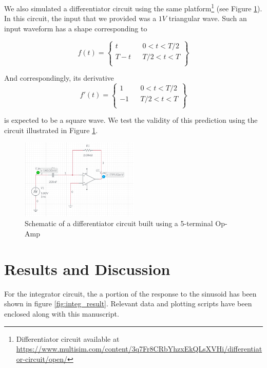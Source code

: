 \documentclass{article}
\begin{document}
	
 We also simulated a differentiator circuit using the same platform\footnote{Differentiator circuit available at \url{https://www.multisim.com/content/3q7Fr8CRbYhzxEkQLsXVHi/differentiator-circuit/open/}} (see Figure \ref{fig:diff_circuit}). In this circuit, the input that we provided was a $1V$ triangular wave. Such an input waveform has a shape corresponding to
 
 $$ f(t) = \left\{ 
 				\begin{array}{llr}
 					t &  &  0 < t < T/2\\
 					T- t &  & T/2 < t < T\\
 				\end{array}
 		\right\}$$
 
 And correspondingly, its derivative $$ f'(t) = 
		 \left\{
		 			\begin{array}{llr}
		 				1 &  & 0 < t < T/2\\
		 				-1 & & T/2 < t < T\\
		 			\end{array}
		 \right\}$$
		 
		 is expected to be a square wave. We test the validity of this prediction using the circuit illustrated in Figure \ref{fig:diff_circuit}.
 
 \begin{figure}[h!]
 	\centering
 	\includegraphics[width=0.5\textwidth]{diff_circuit}
 	\caption{Schematic of a differentiator circuit built using a 5-terminal Op-Amp}
 	\label{fig:diff_circuit}
 \end{figure}
	
	\section*{Results and Discussion}
	\label{sect:results}
	
	For the integrator circuit, the a portion of the response to the sinusoid has been shown in figure \ref{fig:integ_result}. Relevant data and plotting scripts have been enclosed along with this manuscript. \\
	
\end{document}
